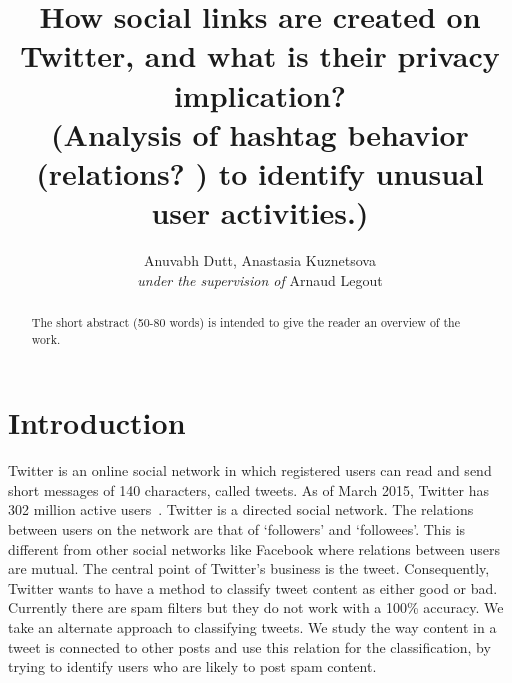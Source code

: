 \documentclass[journal, a4paper, 12pt]{article}
\begin{document}
      \title{How social links are created on Twitter, and what is their privacy implication?\\
    (Analysis of hashtag behavior (relations? ) to identify unusual user activities.)}
      \author{Anuvabh Dutt, Anastasia Kuznetsova \\ \textit{under the supervision of} Arnaud Legout
    }
    
      \maketitle

\begin{abstract}
      The short abstract (50-80 words) is intended to give the reader an overview of the work.
\end{abstract}

\section{Introduction}
Twitter is an online social network in which registered users can read and send short messages of 140 characters, called tweets. As of March 2015, Twitter has 302 million active users~\cite{twitter_stats}. Twitter is a directed social network. The relations between users on the network are that of ‘followers’ and ‘followees’. This is different from other social networks like Facebook where relations between users are mutual. The central point of Twitter's business is the tweet. Consequently, Twitter wants to have a method to classify tweet content as either good or bad. Currently there are spam filters but they do not work with a 100\% accuracy.  We take an alternate approach to classifying tweets. We study the way content in a tweet is connected to other posts and use this relation for the classification, by trying to identify users who are likely to post spam content. \\
    
\end{document}
